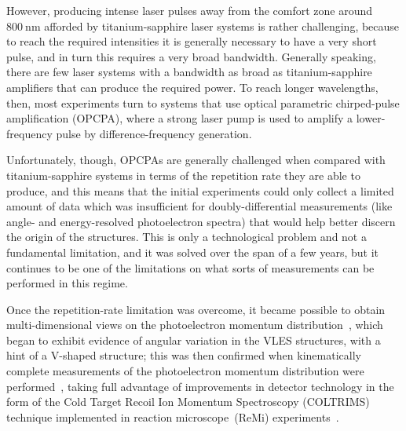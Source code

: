 





However, producing intense laser pulses away from the comfort zone around $\SI{800}{\nano\meter}$ afforded by titanium-sapphire laser systems is rather challenging, because to reach the required intensities it is generally necessary to have a very short pulse, and in turn this requires a very broad bandwidth. Generally speaking, there are few laser systems with a bandwidth as broad as titanium-sapphire amplifiers that can produce the required power. To reach longer wavelengths, then, most experiments turn to systems that use optical parametric chirped-pulse amplification (OPCPA), where a strong laser pump is used to amplify a lower-frequency pulse by difference-frequency generation. 

Unfortunately, though, OPCPAs are generally challenged when compared with ti\-ta\-nium-sapphire systems in terms of the repetition rate they are able to produce, and this means that the initial experiments could only collect a limited amount of data which was insufficient for doubly-differential measurements (like angle- and energy-resolved photoelectron spectra) that would help better discern the origin of the structures. This is only a technological problem and not a fundamental limitation, and it was solved over the span of a few years, but it continues to be one of the limitations on what sorts of measurements can be performed in this regime.



Once the repetition-rate limitation was overcome, it became possible to obtain multi-dimensional views on the photoelectron momentum distribution~\cite{ dura_ionization_2013}, which began to exhibit evidence of angular variation in the VLES structures, with a hint of a V-shaped structure; this was then confirmed when kinematically complete measurements of the photoelectron momentum distribution were performed~\cite{pullen_kinematically_2014}, taking full advantage of improvements in detector technology in the form of the Cold Target Recoil Ion Momentum Spectroscopy (COLTRIMS) technique implemented in reaction microscope~(ReMi) experiments~\cite{moshammer_ReMi_2003,reaction_microscope}.




